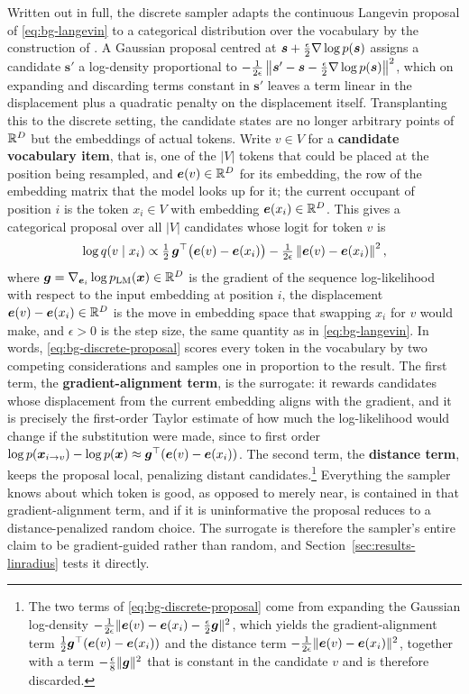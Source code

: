 Written out in full, the discrete sampler adapts the continuous Langevin proposal of \eqref{eq:bg-langevin} to a categorical distribution over the vocabulary by the construction of \citet{zhang2022langevin}. A Gaussian proposal centred at $\bm{s} + \tfrac{\epsilon}{2}\nabla\log p(\bm{s})$ assigns a candidate $\bm{s}'$ a log-density proportional to $-\tfrac{1}{2\epsilon}\left\lVert\bm{s}' - \bm{s} - \tfrac{\epsilon}{2}\nabla\log p(\bm{s})\right\rVert^2$, which on expanding and discarding terms constant in $\bm{s}'$ leaves a term linear in the displacement plus a quadratic penalty on the displacement itself. Transplanting this to the discrete setting, the candidate states are no longer arbitrary points of $\mathbb{R}^D$ but the embeddings of actual tokens. Write $v \in V$ for a \textbf{candidate vocabulary item}, that is, one of the $|V|$ tokens that could be placed at the position being resampled, and $\bm{e}(v) \in \mathbb{R}^D$ for its embedding, the row of the embedding matrix that the model looks up for it; the current occupant of position $i$ is the token $x_i \in V$ with embedding $\bm{e}(x_i) \in \mathbb{R}^D$. This gives a categorical proposal over all $|V|$ candidates whose logit for token $v$ is
\begin{equation}
    \log q(v \mid x_i) \propto \tfrac{1}{2}\,\bm{g}^\top\bigl(\bm{e}(v) - \bm{e}(x_i)\bigr) - \tfrac{1}{2\epsilon}\left\lVert\bm{e}(v) - \bm{e}(x_i)\right\rVert^2,
    \label{eq:bg-discrete-proposal}
\end{equation}
where $\bm{g} = \nabla_{\bm{e}_i}\log p_{\text{LM}}(\bm{x}) \in \mathbb{R}^D$ is the gradient of the sequence log-likelihood with respect to the input embedding at position $i$, the displacement $\bm{e}(v) - \bm{e}(x_i) \in \mathbb{R}^D$ is the move in embedding space that swapping $x_i$ for $v$ would make, and $\epsilon > 0$ is the step size, the same quantity as in \eqref{eq:bg-langevin}. In words, \eqref{eq:bg-discrete-proposal} scores every token in the vocabulary by two competing considerations and samples one in proportion to the result. The first term, the \textbf{gradient-alignment term}, is the surrogate: it rewards candidates whose displacement from the current embedding aligns with the gradient, and it is precisely the first-order Taylor estimate of how much the log-likelihood would change if the substitution were made, since to first order $\log p(\bm{x}_{i \to v}) - \log p(\bm{x}) \approx \bm{g}^\top(\bm{e}(v) - \bm{e}(x_i))$. The second term, the \textbf{distance term}, keeps the proposal local, penalizing distant candidates.\footnote{The two terms of \eqref{eq:bg-discrete-proposal} come from expanding the Gaussian log-density $-\tfrac{1}{2\epsilon}\lVert \bm{e}(v)-\bm{e}(x_i)-\tfrac{\epsilon}{2}\bm{g}\rVert^2$, which yields the gradient-alignment term $\tfrac12\bm{g}^\top(\bm{e}(v)-\bm{e}(x_i))$ and the distance term $-\tfrac{1}{2\epsilon}\lVert\bm{e}(v)-\bm{e}(x_i)\rVert^2$, together with a term $-\tfrac{\epsilon}{8}\lVert\bm{g}\rVert^2$ that is constant in the candidate $v$ and is therefore discarded.} Everything the sampler knows about which token is good, as opposed to merely near, is contained in that gradient-alignment term, and if it is uninformative the proposal reduces to a distance-penalized random choice. The surrogate is therefore the sampler's entire claim to be gradient-guided rather than random, and Section~\ref{sec:results-linradius} tests it directly.


